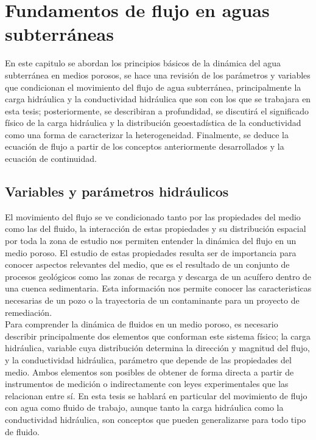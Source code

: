 \chapter{Fundamentos de flujo en aguas subterráneas}

En este capitulo se abordan los principios básicos de la dinámica del agua subterránea en medios porosos, se hace una revisión de los parámetros y variables que condicionan el movimiento del flujo de agua subterránea, principalmente la carga hidráulica y la conductividad hidráulica que son con los que se trabajara en esta tesis; posteriormente, se describiran a profundidad, se discutirá el significado físico de la carga hidráulica y la distribución geoestadística de la conductividad como una forma de caracterizar la heterogeneidad. Finalmente, se deduce la ecuación de flujo a partir de los conceptos anteriormente desarrollados y la ecuación de continuidad.  


\section{Variables y parámetros hidráulicos}

El movimiento del flujo se ve condicionado tanto por las propiedades del medio como las del fluido, la interacción de estas propiedades y su distribución espacial por toda la zona de estudio nos permiten entender la dinámica del flujo en un medio poroso. El estudio de estas propiedades resulta ser de importancia para conocer aspectos relevantes del medio, que es el resultado de un conjunto de procesos geológicos como las zonas de recarga y descarga de un acuífero dentro de una cuenca sedimentaria. Esta información nos permite conocer las caracteristicas necesarias de un pozo o la trayectoria de un contaminante para un proyecto de remediación.
\\

Para comprender la dinámica de fluidos en un medio poroso, es necesario describir principalmente dos elementos que conforman este sistema físico; la carga hidráulica, variable cuya distribución determina la dirección y magnitud del flujo, y la conductividad hidráulica, parámetro que depende de las propiedades del medio. Ambos elementos son posibles de obtener de forma directa a partir de instrumentos de medición o indirectamente con leyes experimentales que las relacionan entre sí. En esta tesis se hablará en particular del movimiento de flujo con agua como fluido de trabajo, aunque tanto la carga hidráulica como la conductividad hidráulica, son conceptos que pueden generalizarse para todo tipo de fluido. 


